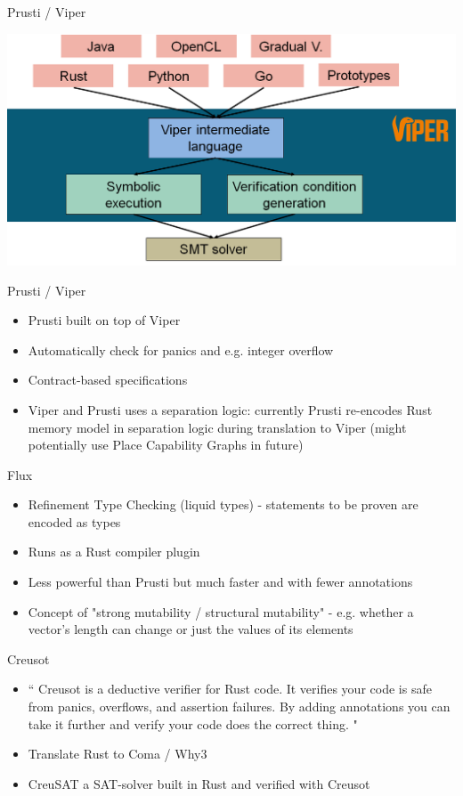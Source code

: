 \documentclass{beamer}
\begin{document}
\begin{frame}{Prusti / Viper} 
\begin{center}
\includegraphics[scale=0.3]{pictures/viper.png}
\end{center}
\end{frame}


\begin{frame}{Prusti / Viper} 
\begin{itemize}
\item Prusti built on top of Viper
\item Automatically check for panics and e.g. integer overflow
\item Contract-based specifications
\item Viper and Prusti uses a separation logic: currently Prusti re-encodes Rust memory model in separation logic during translation to Viper (might potentially use Place Capability Graphs in future)
\end{itemize}
\end{frame}

\begin{frame}{Flux} 
\begin{itemize}
\item Refinement Type Checking (liquid types) - statements to be proven are encoded as types
\item Runs as a Rust compiler plugin 
\item Less powerful than Prusti but much faster and with fewer annotations
\item Concept of "strong mutability / structural mutability" - e.g. whether a vector's length can change or just the values of its elements
\end{itemize}
\end{frame}

\begin{frame}{Creusot} 
\begin{itemize}
\item ``
Creusot is a deductive verifier for Rust code. It verifies your code is safe from panics, overflows, and assertion failures. By adding annotations you can take it further and verify your code does the correct thing.
"
\item Translate Rust to Coma / Why3
\item CreuSAT a SAT-solver built in Rust and verified with Creusot
\end{itemize}
\end{frame}
\end{document}
